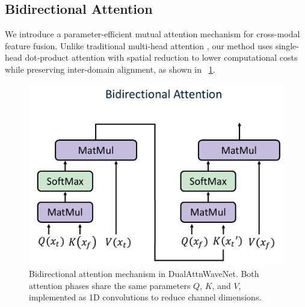 \documentclass[conference]{IEEEtran}
\begin{document}




\subsection{Bidirectional Attention}
\label{subsec:bi_attn}

We introduce a parameter-efficient mutual attention mechanism for cross-modal feature fusion. Unlike traditional multi-head attention \cite{vaswaniAttentionAllYou2017}, our method uses single-head dot-product attention with spatial reduction to lower computational costs while preserving inter-domain alignment, as shown in \figurename~\ref{fig:bidirectional-attention}.

\begin{figure}[tb]
    \centering
    \includegraphics[width=0.65\linewidth]{bidirectional-attention.pdf}
    \caption{Bidirectional attention mechanism in DualAttnWaveNet. Both attention phases share the same parameters $Q$, $K$, and $V$, implemented as 1D convolutions to reduce channel dimensions.}
    \label{fig:bidirectional-attention}
\end{figure}
\end{document}
